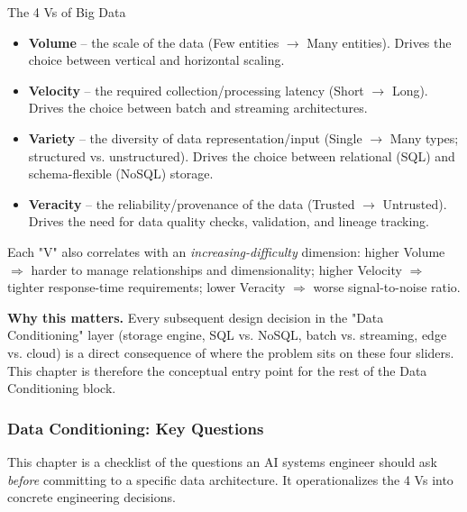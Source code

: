 \begin{defbox}{The 4 Vs of Big Data}
\begin{itemize}
    \item \textbf{Volume} -- the scale of the data (Few entities $\rightarrow$ Many entities). Drives the choice between vertical and horizontal scaling.
    \vspace{0.2cm}
    \item \textbf{Velocity} -- the required collection/processing latency (Short $\rightarrow$ Long). Drives the choice between batch and streaming architectures.
    \vspace{0.2cm}
    \item \textbf{Variety} -- the diversity of data representation/input (Single $\rightarrow$ Many types; structured vs. unstructured). Drives the choice between relational (SQL) and schema-flexible (NoSQL) storage.
    \vspace{0.2cm}
    \item \textbf{Veracity} -- the reliability/provenance of the data (Trusted $\rightarrow$ Untrusted). Drives the need for data quality checks, validation, and lineage tracking.
\end{itemize}

\end{defbox}

Each "V" also correlates with an \emph{increasing-difficulty} dimension: higher Volume $\Rightarrow$ harder to manage relationships and dimensionality; higher Velocity $\Rightarrow$ tighter response-time requirements; lower Veracity $\Rightarrow$ worse signal-to-noise ratio.



\textbf{Why this matters.} Every subsequent design decision in the "Data Conditioning" layer (storage engine, SQL vs. NoSQL, batch vs. streaming, edge vs. cloud) is a direct consequence of where the problem sits on these four sliders. This chapter is therefore the conceptual entry point for the rest of the Data Conditioning block.

\subsubsection{Data Conditioning: Key Questions}

This chapter is a checklist of the questions an AI systems engineer should ask \emph{before} committing to a specific data architecture. It operationalizes the 4 Vs into concrete engineering decisions.

